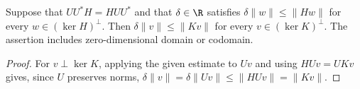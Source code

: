 \begin{lemma}
    \label{thm:mpo_rectangular_compression_gap}
    Suppose that $UU^*H=HUU^*$ and that $\delta\in\R$ satisfies
    $\delta\lVert w\rVert\le\lVert Hw\rVert$ for every
    $w\in(\ker H)^\perp$. Then
    $\delta\lVert v\rVert\le\lVert Kv\rVert$ for every
    $v\in(\ker K)^\perp$. The assertion includes zero-dimensional
    domain or codomain.
\end{lemma}
\begin{proof}
    For $v\perp\ker K$, applying the given estimate to $Uv$ and using
    $HUv=UKv$ gives, since $U$ preserves norms,
    $\delta\lVert v\rVert=\delta\lVert Uv\rVert
        \le\lVert HUv\rVert=\lVert Kv\rVert$.
\end{proof}

